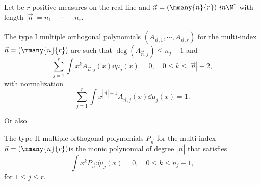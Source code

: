 Let  be $r$ positive measures on the real line and $\vec{n} = (\mmany{n}{r}) \ in \N^r$ with length $|\vec{n}| = n_1 + \cdots + n_r$.

\begin{definition}
	The type I multiple orthogonal polynomials $(A_{\vec{n}, 1}, \cdots, A_{\vec{n}, r})$ for the multi-index $\vec{n} = (\mmany{n}{r}) $ are such that $\deg(A_{\vec{n},j}) \leq n_j - 1$ and 
	\begin{equation}
		\sum_{j=1}^{r} \int x^k A_{\vec{n}, j}(x) \dd \mu_j(x) = 0, \quad 0 \leq k \leq |\vec{n}| - 2, 
	\end{equation}
	with normalization
	\begin{equation}
		\sum_{j=1}^{r} \int x^{|\vec{n}| - 1} A_{\vec{n}, j}(x) \dd \mu_j(x) = 1.
	\end{equation}
\end{definition}

Or also

\begin{definition}
	The type II multiple orthogonal polynomials $P_{\vec{n}}$ for the multi-index $\vec{n} = (\mmany{n}{r}) $is the monic polynomial of degree $|\vec{n}|$ that satisfies 
	\begin{equation}
	\int x^k P_{\vec{n}} \dd \mu_j(x) = 0, \quad 0 \leq k \leq n_j - 1, 
	\end{equation}
	for $1 \leq j \leq r$.
\end{definition}

